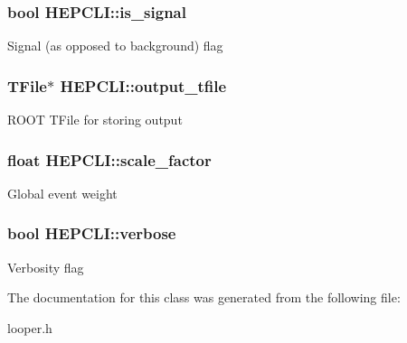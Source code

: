 \subsubsection[{\texorpdfstring{is\+\_\+signal}{is_signal}}]{\setlength{\rightskip}{0pt plus 5cm}bool H\+E\+P\+C\+L\+I\+::is\+\_\+signal}\hypertarget{classHEPCLI_ae1d563a29c5a238e0469442bad714e6e}{}\label{classHEPCLI_ae1d563a29c5a238e0469442bad714e6e}
Signal (as opposed to background) flag 
\subsubsection[{\texorpdfstring{output\+\_\+tfile}{output_tfile}}]{\setlength{\rightskip}{0pt plus 5cm}T\+File$\ast$ H\+E\+P\+C\+L\+I\+::output\+\_\+tfile}\hypertarget{classHEPCLI_ab900d2e3822e20d636564874440d33f0}{}\label{classHEPCLI_ab900d2e3822e20d636564874440d33f0}
R\+O\+OT T\+File for storing output 
\subsubsection[{\texorpdfstring{scale\+\_\+factor}{scale_factor}}]{\setlength{\rightskip}{0pt plus 5cm}float H\+E\+P\+C\+L\+I\+::scale\+\_\+factor}\hypertarget{classHEPCLI_a027e714e73b6fcdd0cb73eb8445bbfa4}{}\label{classHEPCLI_a027e714e73b6fcdd0cb73eb8445bbfa4}
Global event weight 
\subsubsection[{\texorpdfstring{verbose}{verbose}}]{\setlength{\rightskip}{0pt plus 5cm}bool H\+E\+P\+C\+L\+I\+::verbose}\hypertarget{classHEPCLI_a50592a47a23f3e33a774a747ee32bf00}{}\label{classHEPCLI_a50592a47a23f3e33a774a747ee32bf00}
Verbosity flag 

The documentation for this class was generated from the following file\+:\begin{DoxyCompactItemize}
\item 
looper.\+h\end{DoxyCompactItemize}
